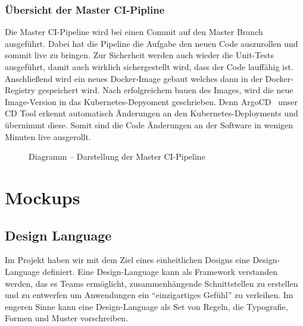 \subsubsection{Übersicht der Master \ac{CI}-Pipline}
Die Master \ac{CI}-Pipeline wird bei einen Commit auf den Master Branch ausgeführt. Dabei hat die Pipeline die Aufgabe den neuen Code auszurollen und sommit live zu bringen.
Zur Sicherheit werden auch wieder die Unit-Tests ausgeführt, damit auch wirklich sichergestellt wird, dass der Code lauffähig ist. Anschließend wird ein neues Docker-Image gebaut
welches dann in der Docker-Registry gespeichert wird. Nach erfolgreichem bauen des Images, wird die neue Image-Version in das Kubernetes-Depyoment geschrieben. Denn ArgoCD~\parencite{web/argocd} unser \ac{CD} Tool
erkennt automatisch Änderungen an den Kubernetes-Deployments und übernimmt diese. Somit sind die Code Änderungen an der Software in wenigen Minuten live ausgerollt.
\begin{figure}[!htbp]
    \centering    
    \usetikzlibrary{positioning}
\caption{Diagramm – Darstellung der Master \ac{CI}-Pipeline}
\end{figure}

\section{Mockups}
\subsection{Design Language}
Im Projekt haben wir mit dem Ziel eines einheitlichen Designs eine Design-Language definiert.
Eine Design-Language kann als Framework verstanden werden, das es Teams ermöglicht, 
zusammenhängende Schnittstellen zu erstellen und zu entwerfen um Anwendungen ein \enquote{einzigartiges Gefühl} zu verleihen.
Im engeren Sinne kann eine Design-Language als Set von Regeln, die Typografie, Formen und Muster vorschreiben.

